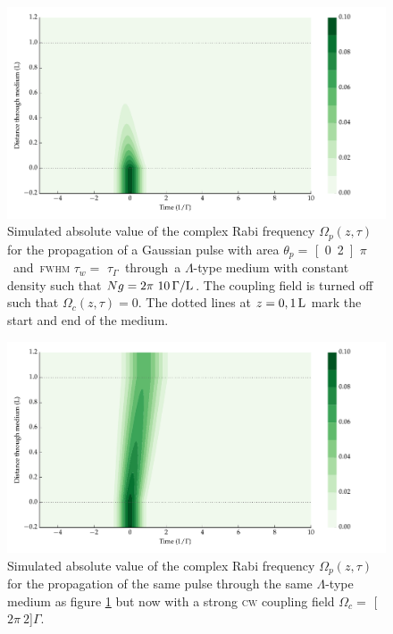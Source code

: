     \begin{figure}[p]
      \includegraphics[width=\linewidth]
        {figs/04_polaritons/pls_p0_2pi_t1_Ng1e1_c0_fig1.pdf}
      \caption{
      Simulated absolute value of the complex Rabi frequency $\Omega_p(z, \tau)$
      for the propagation of a Gaussian pulse with area $\theta_p = $
      \unit[0.2]{$\pi$} and \textsc{fwhm} $\tau_w = $ \unit[1]{$\tau_\Gamma$}
      through a $\Lambda$-type medium with constant density such that $Ng =
      \unit[2\pi~10]{\Gamma/L}$. The coupling field is turned off such that
      $\Omega_c(z, \tau) = 0$. The dotted lines at $z = \unit[0, 1]{L}$ mark the
      start and end of the medium.
      }
      \label{fig:eit_no_coupling}
    \end{figure}

    \begin{figure}[p]
      \includegraphics[width=\linewidth]
        {figs/04_polaritons/pls_p0_2pi_t1_Ng1e1_c02_fig1.pdf}
      \caption{
      Simulated absolute value of the complex Rabi frequency $\Omega_p(z, \tau)$
      for the propagation of the same pulse through the same $\Lambda$-type
      medium as figure \ref{fig:eit_no_coupling} but now with a strong
      \textsc{cw} coupling field $\Omega_c = $ \unit[$2\pi~2$]{$\Gamma$}.
      }
      \label{fig:eit_coupling}
    \end{figure}


